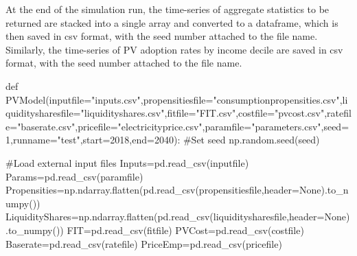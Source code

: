 \documentclass[
  letterpaper,
  DIV=11,
  numbers=noendperiod]{scrartcl}
\newenvironment{Shaded}{\begin{snugshade}}{\end{snugshade}}
\newcommand{\CommentTok}[1]{\textcolor[rgb]{0.37,0.37,0.37}{#1}}
\newcommand{\DecValTok}[1]{\textcolor[rgb]{0.68,0.00,0.00}{#1}}
\newcommand{\KeywordTok}[1]{\textcolor[rgb]{0.00,0.23,0.31}{#1}}
\newcommand{\NormalTok}[1]{\textcolor[rgb]{0.00,0.23,0.31}{#1}}
\newcommand{\OperatorTok}[1]{\textcolor[rgb]{0.37,0.37,0.37}{#1}}
\newcommand{\StringTok}[1]{\textcolor[rgb]{0.13,0.47,0.30}{#1}}
\newcommand{\VariableTok}[1]{\textcolor[rgb]{0.07,0.07,0.07}{#1}}
\begin{document}
At the end of the simulation run, the time-series of aggregate
statistics to be returned are stacked into a single array and converted
to a dataframe, which is then saved in csv format, with the seed number
attached to the file name. Similarly, the time-series of PV adoption
rates by income decile are saved in csv format, with the seed number
attached to the file name.

\begin{Shaded}
\begin{Highlighting}[]
\KeywordTok{def}\NormalTok{ PVModel(inputfile}\OperatorTok{=}\StringTok{"inputs.csv"}\NormalTok{,propensitiesfile}\OperatorTok{=}\StringTok{"consumptionpropensities.csv"}\NormalTok{,liquiditysharesfile}\OperatorTok{=}\StringTok{"liquidityshares.csv"}\NormalTok{,fitfile}\OperatorTok{=}\StringTok{"FIT.csv"}\NormalTok{,costfile}\OperatorTok{=}\StringTok{"pvcost.csv"}\NormalTok{,ratefile}\OperatorTok{=}\StringTok{"baserate.csv"}\NormalTok{,pricefile}\OperatorTok{=}\StringTok{"electricityprice.csv"}\NormalTok{,paramfile}\OperatorTok{=}\StringTok{"parameters.csv"}\NormalTok{,seed}\OperatorTok{=}\DecValTok{1}\NormalTok{,runname}\OperatorTok{=}\StringTok{"test"}\NormalTok{,start}\OperatorTok{=}\DecValTok{2018}\NormalTok{,end}\OperatorTok{=}\DecValTok{2040}\NormalTok{):}
    \CommentTok{\#Set seed}
\NormalTok{    np.random.seed(seed)}
    
    \CommentTok{\#Load external input files}
\NormalTok{    Inputs}\OperatorTok{=}\NormalTok{pd.read\_csv(inputfile)}
\NormalTok{    Params}\OperatorTok{=}\NormalTok{pd.read\_csv(paramfile)}
\NormalTok{    Propensities}\OperatorTok{=}\NormalTok{np.ndarray.flatten(pd.read\_csv(propensitiesfile,header}\OperatorTok{=}\VariableTok{None}\NormalTok{).to\_numpy())}
\NormalTok{    LiquidityShares}\OperatorTok{=}\NormalTok{np.ndarray.flatten(pd.read\_csv(liquiditysharesfile,header}\OperatorTok{=}\VariableTok{None}\NormalTok{).to\_numpy())}
\NormalTok{    FIT}\OperatorTok{=}\NormalTok{pd.read\_csv(fitfile)}
\NormalTok{    PVCost}\OperatorTok{=}\NormalTok{pd.read\_csv(costfile)}
\NormalTok{    Baserate}\OperatorTok{=}\NormalTok{pd.read\_csv(ratefile)}
\NormalTok{    PriceEmp}\OperatorTok{=}\NormalTok{pd.read\_csv(pricefile)}


\end{Highlighting}
\end{Shaded}
\end{document}
